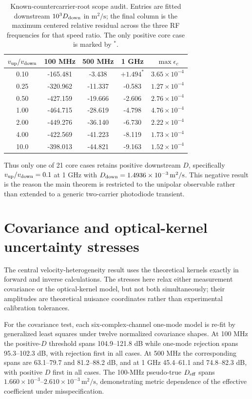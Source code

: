 \documentclass[aps,pra,onecolumn,superscriptaddress,nofootinbib]{revtex4-2}
\begin{document}
\begin{table}[h]
\caption{Known-countercarrier-root scope audit. Entries are fitted downstream $10^3D_{\rm down}$ in $\mathrm{m^2/s}$; the final column is the maximum centered relative residual across the three RF frequencies for that speed ratio. The only positive core case is marked by $^*$.}
\centering
\begin{tabular}{ccccc}
\toprule
$v_{\rm up}/v_{\rm down}$ & 100 MHz & 500 MHz & 1 GHz & $\max\epsilon_c$\\
\midrule
0.10 & -165.481 & -3.438 & $+1.494^*$ & $3.65\times10^{-4}$\\
0.25 & -320.962 & -11.337 & -0.583 & $1.27\times10^{-4}$\\
0.50 & -427.159 & -19.666 & -2.606 & $2.76\times10^{-4}$\\
1.00 & -464.715 & -28.619 & -4.798 & $4.76\times10^{-4}$\\
2.00 & -449.276 & -36.140 & -6.730 & $2.22\times10^{-4}$\\
4.00 & -422.569 & -41.223 & -8.119 & $1.73\times10^{-4}$\\
10.0 & -398.013 & -44.821 & -9.163 & $1.52\times10^{-4}$\\
\bottomrule
\end{tabular}
\end{table}

Thus only one of 21 core cases retains positive downstream $D$, specifically $v_{\rm up}/v_{\rm down}=0.1$ at 1 GHz with $D_{\rm down}=1.4936\times10^{-3}\,\mathrm{m^2/s}$. This negative result is the reason the main theorem is restricted to the unipolar observable rather than extended to a generic two-carrier photodiode transient.

\section{Covariance and optical-kernel uncertainty stresses}

The central velocity-heterogeneity result uses the theoretical kernels exactly in forward and inverse calculations. The stresses here relax either measurement covariance or the optical-kernel model, but not both simultaneously; their amplitudes are theoretical nuisance coordinates rather than experimental calibration tolerances.

For the covariance test, each six-complex-channel one-mode model is re-fit by generalized least squares under twelve normalized covariance shapes. At 100 MHz the positive-$D$ threshold spans 104.9--121.8 dB while one-mode rejection spans 95.3--102.3 dB, with rejection first in all cases. At 500 MHz the corresponding spans are 63.1--79.7 and 81.2--88.2 dB, and at 1 GHz 45.4--61.1 and 74.8--82.3 dB, with positive $D$ first in all cases. The 100-MHz pseudo-true $D_{\rm eff}$ spans $1.660\times10^{-3}$--$2.610\times10^{-3}\,\mathrm{m^2/s}$, demonstrating metric dependence of the effective coefficient under misspecification.
\end{document}
